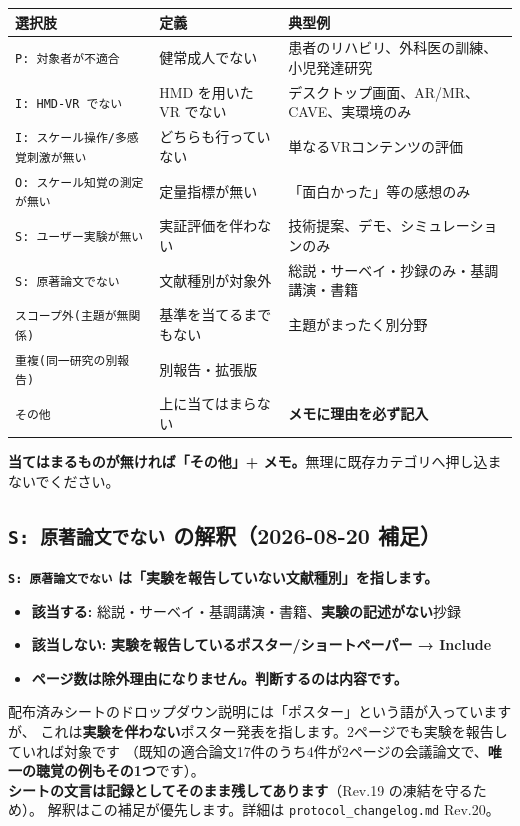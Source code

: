 \documentclass[a4paper]{ltjsarticle}
\newcommand{\notebox}[1]{%
  \par\medskip
  \noindent\colorbox{warn}{%
    \begin{minipage}{\dimexpr\linewidth-2\fboxsep\relax}
      \vspace{4pt}#1\vspace{4pt}
    \end{minipage}}%
  \par\medskip}
\newcommand{\rsn}[1]{\texttt{\small #1}}
\begin{document}
\begin{center}
\begin{tabularx}{\linewidth}{L{13.2em} L{10em} X}
\toprule
選択肢 & 定義 & 典型例 \\
\midrule
\rsn{P: 対象者が不適合} & 健常成人でない & 患者のリハビリ、外科医の訓練、小児発達研究 \\
\rsn{I: HMD-VR でない} & HMD を用いた VR でない & デスクトップ画面、AR/MR、CAVE、実環境のみ \\
\rsn{I: スケール操作/多感覚刺激が無い} & どちらも行っていない & 単なるVRコンテンツの評価 \\
\rsn{O: スケール知覚の測定が無い} & 定量指標が無い & 「面白かった」等の感想のみ \\
\rsn{S: ユーザー実験が無い} & 実証評価を伴わない & 技術提案、デモ、シミュレーションのみ \\
\rsn{S: 原著論文でない} & 文献種別が対象外 & 総説・サーベイ・抄録のみ・基調講演・書籍 \\
\rsn{スコープ外(主題が無関係)} & 基準を当てるまでもない & 主題がまったく別分野 \\
\rsn{重複(同一研究の別報告)} & 別報告・拡張版 & \\
\rsn{その他} & 上に当てはまらない & \textbf{メモに理由を必ず記入} \\
\bottomrule
\end{tabularx}
\end{center}

\noindent
\textbf{当てはまるものが無ければ「その他」+ メモ。}無理に既存カテゴリへ押し込まないでください。

\subsection{\rsn{S: 原著論文でない} の解釈（2026-08-20 補足）}

\notebox{%
\textbf{\rsn{S: 原著論文でない} は「実験を報告していない文献種別」を指します。}
\begin{itemize}
  \item \textbf{該当する:} 総説・サーベイ・基調講演・書籍、\textbf{実験の記述がない}抄録
  \item \textbf{該当しない:} \textbf{実験を報告しているポスター/ショートペーパー → Include}
  \item \textbf{ページ数は除外理由になりません。判断するのは内容です。}
\end{itemize}
配布済みシートのドロップダウン説明には「ポスター」という語が入っていますが、
これは\textbf{実験を伴わない}ポスター発表を指します。2ページでも実験を報告していれば対象です
（既知の適合論文17件のうち4件が2ページの会議論文で、\textbf{唯一の聴覚の例もその1つ}です）。\\[4pt]
\textbf{シートの文言は記録としてそのまま残してあります}（Rev.19 の凍結を守るため）。
解釈はこの補足が優先します。詳細は \texttt{protocol\_changelog.md} Rev.20。}
\end{document}
